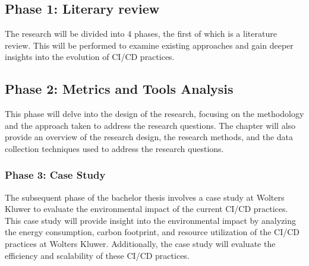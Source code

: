 
\chapter{}%
\label{ch:methodologie}


\section{Phase 1: Literary review}
The research will be divided into 4 phases, the first of which is a literature review. This will be performed to examine existing approaches and gain deeper insights into the evolution of CI/CD practices.

\section{Phase 2: Metrics and Tools Analysis}
This phase will delve into the design of the research, focusing on the methodology and the approach taken to address the research questions. The chapter will also provide an overview of the research design, the research methods, and the data collection techniques used to address the research questions.

\subsection{Phase 3: Case Study}
The subsequent phase of the bachelor thesis involves a case study at Wolters Kluwer to evaluate the environmental impact of the current CI/CD practices. This case study will provide insight into the environmental impact by analyzing the energy consumption, carbon footprint, and resource utilization of the CI/CD practices at Wolters Kluwer. Additionally, the case study will evaluate the efficiency and scalability of these CI/CD practices.

